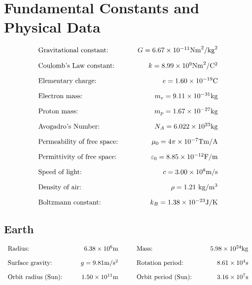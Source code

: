 \documentclass[12pt,a4paper]{article}
\begin{document}
\section{Fundamental Constants and Physical Data}

\begin{align*}
  \begin{array}{l@{\hspace{1cm}}r}
    \text{Gravitational constant:} & G=6.67 \times 10^{-11} \mathrm{Nm}^2/\mathrm{kg}^2 \\[1em]
    \text{Coulomb's Law constant:} & k=8.99 \times 10^9 \mathrm{Nm}^2/\mathrm{C}^2 \\[1em]
    \text{Elementary charge:} & e=1.60 \times 10^{-19} \mathrm{C} \\[1em]
    \text{Electron mass:} & m_e=9.11 \times 10^{-31} \mathrm{kg} \\[1em]
    \text{Proton mass:} & m_p=1.67 \times 10^{-27} \mathrm{kg} \\[1em]
    \text{Avogadro's Number:} & N_A=6.022 \times 10^{23} \mathrm{kg} \\[1em]
    \text{Permeability of free space:} & \mu_0=4\pi \times 10^{-7} \mathrm{Tm}/\mathrm{A} \\[1em]
    \text{Permittivity of free space:} & \varepsilon_0 = 8.85 \times 10^{-12} \mathrm{F}/\mathrm{m} \\[1em]
    \text{Speed of light:} & c=3.00 \times 10^8 \mathrm{m}/\mathrm{s} \\[1em]
    \text{Density of air:} & \rho=1.21 \mathrm{~kg} / \mathrm{m}^3 \\[1em]
    \text{Boltzmann constant:} & k_B=1.38 \times 10^{-23} \mathrm{J}/\mathrm{K}
  \end{array}
\end{align*}

\subsection{Earth}
\begin{align*}
  \begin{array}{l@{\hspace{1cm}}r@{\hspace{1cm}}l@{\hspace{1cm}}r}
    \text{Radius:} & 6.38 \times 10^6 \mathrm{m} & \text{Mass:} & 5.98 \times 10^{24} \mathrm{kg} \\[1em]
    \text{Surface gravity:} & g=9.81 \mathrm{m}/\mathrm{s}^2 & \text{Rotation period:} & 8.61 \times 10^4 \mathrm{s} \\[1em]
    \text{Orbit radius (Sun):} & 1.50 \times 10^{11} \mathrm{m} & \text{Orbit period (Sun):} & 3.16 \times 10^7 \mathrm{s}
  \end{array}
\end{align*}
\end{document}
